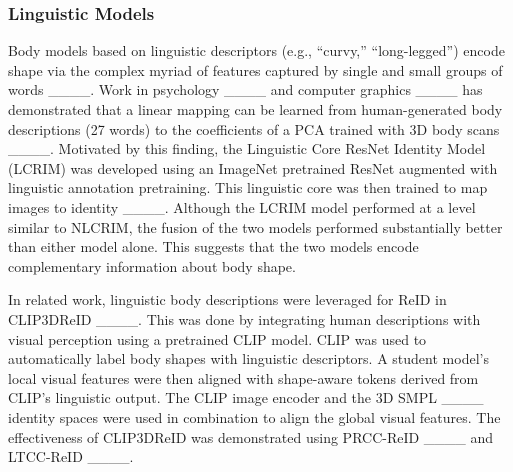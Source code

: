 \subsubsection{Linguistic Models} 
Body models based on linguistic descriptors  (e.g., “curvy,” “long-legged”)  encode  shape via the complex myriad of features captured by single and small groups of words ____. 
Work in psychology ____ and computer graphics ____ has  demonstrated that a linear mapping can be learned from human-generated body descriptions (27 words) to the coefficients of a PCA trained with 3D body scans ____. Motivated by this finding, the Linguistic Core ResNet Identity Model (LCRIM)
 was developed using an ImageNet pretrained ResNet augmented
with linguistic annotation pretraining. This linguistic core was then trained to map images to identity ____. Although the LCRIM model performed at a level similar to NLCRIM, the fusion of the two models performed substantially better than either model alone. This suggests that the two models encode complementary 
information about body shape.

In related work, linguistic body descriptions were
leveraged for ReID in CLIP3DReID ____. This was done by integrating human descriptions with visual perception using a pretrained CLIP model. CLIP was used to automatically label body shapes with linguistic descriptors. A student model's local visual features were then aligned with shape-aware tokens derived from CLIP's linguistic output. The CLIP image encoder and the 3D SMPL ____ identity spaces were used in combination to align the global visual features. The effectiveness
of CLIP3DReID was demonstrated using  PRCC-ReID ____ and  LTCC-ReID ____.



